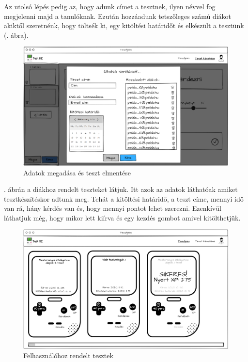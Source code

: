 Az utolsó lépés pedig az, hogy adunk címet a tesztnek, ilyen névvel fog megjelenni majd a tanulóknak. Ezután hozzáadunk tetszőleges számú diákot akiktől szeretnénk, hogy töltsék ki, egy kitöltési határidőt és elkészült a tesztünk (. ábra).

\begin{figure}[h!]
    \centering
    \includegraphics[width=\linewidth]{images/make_test4_wireframe.png}
    \caption{Adatok megadása és teszt elmentése}
    \label{fig:save_test}
\end{figure}


. ábrán a diákhoz rendelt teszteket látjuk. Itt azok az adatok láthatóak amiket tesztkészítéskor adtunk meg. Tehát a kitöltési határidő, a teszt címe, mennyi idő van rá, hány kérdés van és, hogy mennyi pontot lehet szerezni. Ezenkívül láthatjuk még, hogy mikor lett kiírva és egy kezdés gombot amivel kitölthetjük.

\begin{figure}[h!]
    \centering
    \includegraphics[width=\linewidth]{images/my_tests_wireframe.png}
    \caption{Felhasználóhoz rendelt tesztek}
    \label{fig:my_tests}
\end{figure}

